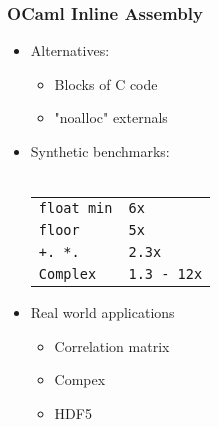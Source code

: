 \documentclass{beamer}
\begin{document}
\begin{frame}
  \frametitle{OCaml Inline Assembly}
  \begin{itemize}
    \item Alternatives:
      \begin{itemize}
        \item Blocks of C code
        \item "noalloc" externals
      \end{itemize}
      \medskip
    \item Synthetic benchmarks: \\
      \medskip
      \footnotesize \
      \begin{tabular}{ll}
        \texttt{float min} & \texttt{6x} \\
        \texttt{floor} & \texttt{5x} \\
        \texttt{+. *.} & \texttt{2.3x} \\
        \texttt{Complex} & \texttt{1.3 - 12x} \\
      \end{tabular}
      \medskip
    \item Real world applications
      \begin{itemize}
        \item Correlation matrix
        \item Compex
        \item HDF5
      \end{itemize}
  \end{itemize}
\end{frame}
\end{document}
